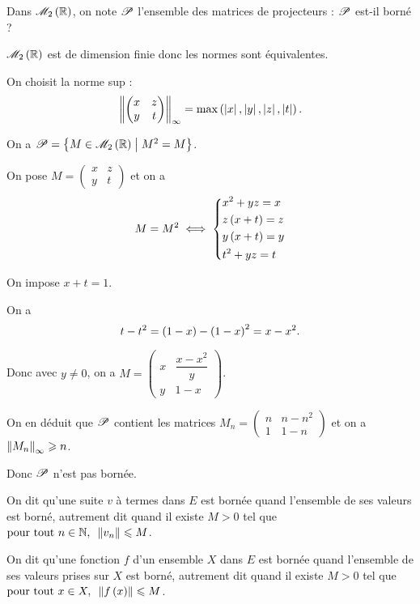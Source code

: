 \begin{exo}
Dans \(\M{2}[\R]\), on note \(\mathscr{P}\) l'ensemble des matrices de projecteurs : \(\mathscr{P}\) est-il borné ?
\end{exo}

\begin{corr}
\(\M{2}[\R]\) est de dimension finie donc les normes sont équivalentes.

On choisit la norme sup : \[\norme{\begin{pmatrix}x & z \\
y & t\end{pmatrix}}_\infty=\max\paren{\abs{x},\abs{y},\abs{z},\abs{t}}.\]

On a \(\fami{P}=\accol{M\in\M{2}[\R]\tq M^2=M}\).

On pose \(M=\begin{pmatrix}
x & z \\
y & t
\end{pmatrix}\) et on a \[M=M^2\iff\begin{dcases}
x^2+yz=x \\
z\left(x+t\right)=z \\
y\left(x+t\right)=y \\
t^2+yz=t
\end{dcases}\]

On impose \(x+t=1\).

On a \[t-t^2=\left(1-x\right)-\left(1-x\right)^2=x-x^2.\]

Donc avec \(y\not=0\), on a \(M=\begin{pmatrix}
x & \dfrac{x-x^2}{y} \\
y & 1-x
\end{pmatrix}\).

On en déduit que \(\mathscr{P}\) contient les matrices \(M_n=\begin{pmatrix}
n & n-n^2 \\
1 & 1-n
\end{pmatrix}\) et on a \(\norme{M_n}_\infty\geq n\).

Donc \(\mathscr{P}\) n'est pas bornée.
\end{corr}

\begin{defi}
On dit qu'une suite \(v\) à termes dans \(E\) est bornée quand l'ensemble de ses valeurs est borné, autrement dit quand il existe \(M>0\) tel que \(\quantifs{\tpt n\in\N}\norme{v_n}\leq M\).

On dit qu'une fonction \(f\) d'un ensemble \(X\) dans \(E\) est bornée quand l'ensemble de ses valeurs prises sur \(X\) est borné, autrement dit quand il existe \(M>0\) tel que \(\quantifs{\tpt x\in X}\norme{f\paren{x}}\leq M\).
\end{defi}

